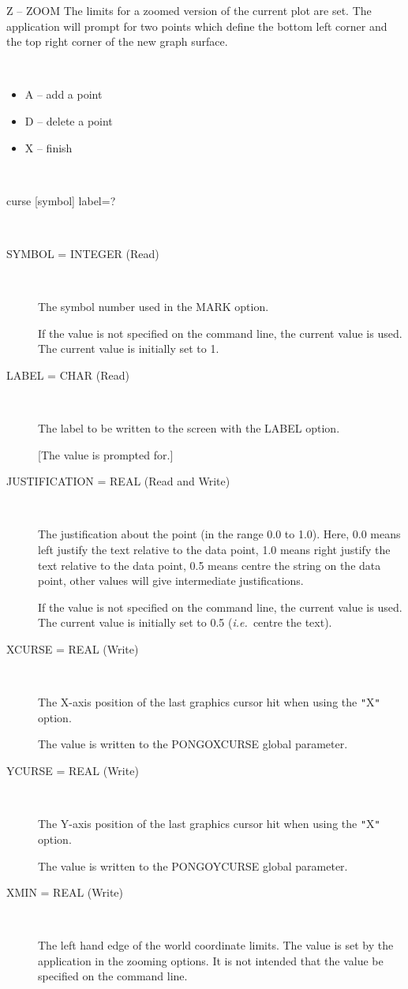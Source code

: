 \documentclass[twoside,11pt]{article}
\renewcommand{\_}{\texttt{\symbol{95}}}
\newcommand{\ie}{{\em i.e.\ }}
\newcommand{\sstusage}[1]{\item[Usage:] \mbox{}
\\[1.3ex]{\raggedright \ssttt #1}}
\newcommand{\sstparameters}[1]{
   \item[Parameters:] \mbox{} \\
   \vspace{-3.5ex}
   \begin{description}
      #1
   \end{description}
}
\newcommand{\sstsubsection}[1]{ \item[{#1}] \mbox{} \\}
\newcommand{\sstitemlist}[1]{
  \mbox{} \\
  \vspace{-3.5ex}
  \begin{itemize}
     #1
  \end{itemize}
}
\newcommand{\sstitem}{\item}
\newcommand{\sstusage}[1]{\item[Usage:]
      \begin{description}
         {\ssttt #1}
      \end{description}
      \\
   }
\newcommand{\sstparameters}[1]{
      \item[Parameters:] \\
      \begin{description}
         #1
      \end{description}
      \\
   }
\newcommand{\sstsubsection}[1]{\item[{#1}]}
\newcommand{\sstitemlist}[1]{
      \begin{itemize}
         #1
      \end{itemize}
      \\
   }
\newcommand{\sstitem}{\item}
\begin{document}
\begin{sloppypar}
{{{         \sstitem
            Z -- ZOOM
            The limits for a zoomed version of the current plot are
            set. The application will prompt for two points which
            define the bottom left corner and the top right corner of
            the new graph surface.

         \sstitemlist{

            \sstitem
                  A -- add a point

            \sstitem
                  D -- delete a point

            \sstitem
                  X -- finish
         }
      }
   }
   \sstusage {
      curse [symbol] label=?
   }
   \sstparameters{
      \sstsubsection{
         SYMBOL = \_INTEGER (Read)
      }{
         The symbol number used in the MARK option.

         If the value is not specified on the command line, the current
         value is used. The current value is initially set to 1.
      }
      \sstsubsection{
         LABEL = \_CHAR (Read)
      }{
         The label to be written to the screen with the LABEL option.

         [The value is prompted for.]
      }
      \sstsubsection{
         JUSTIFICATION = \_REAL (Read and Write)
      }{
         The justification about the point (in the range 0.0 to 1.0).
         Here, 0.0 means left justify the text relative to the data
         point, 1.0 means right justify the text relative to the data
         point, 0.5 means centre the string on the data point, other
         values will give intermediate justifications.

         If the value is not specified on the command line, the current
         value is used. The current value is initially set to 0.5 
         (\ie centre the text).
      }
      \sstsubsection{
         XCURSE = \_REAL (Write)
      }{
         The X-axis position of the last graphics cursor hit when using
         the {\tt "}X{\tt "} option.

         The value is written to the PONGO\_XCURSE global parameter.
      }
      \sstsubsection{
         YCURSE = \_REAL (Write)
      }{
         The Y-axis position of the last graphics cursor hit when using
         the {\tt "}X{\tt "} option.

         The value is written to the PONGO\_YCURSE global parameter.
      }
      \sstsubsection{
         XMIN = \_REAL (Write)
      }{
         The left hand edge of the world coordinate limits. The value
         is set by the application in the zooming options. It is not
         intended that the value be specified on the command line.

}}}
\end{sloppypar}
\end{document}
